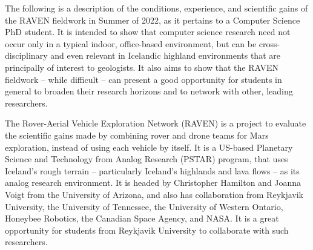 The following is a description of the
conditions, experience, and scientific gains
of the RAVEN fieldwork in Summer of 2022,
as it pertains to a Computer Science PhD student.
It is intended to show that computer science research need not occur only in
a typical indoor, office-based environment,
but can be cross-disciplinary and even relevant in Icelandic highland environments
that are principally of interest to geologists.
It also aims to show that the RAVEN fieldwork -- while difficult -- can present a good opportunity
for students in general to broaden their research horizons
and to network with other, leading researchers.

The Rover-Aerial Vehicle Exploration Network (RAVEN) is a project to evaluate the scientific gains
made by combining rover and drone teams for Mars exploration, instead of using each vehicle by itself.
It is a US-based Planetary Science and Technology from Analog Research (PSTAR) program,
that uses Iceland's rough terrain -- particularly Iceland's highlands and lava flows --
as its analog research environment.
It is headed by Christopher Hamilton and Joanna Voigt from the University of Arizona,
and also has collaboration from Reykjavik University, the University of Tennessee,
the University of Western Ontario, Honeybee Robotics, the Canadian Space Agency, and NASA.
It is a great opportunity for students from Reykjavik University to collaborate with such researchers.
